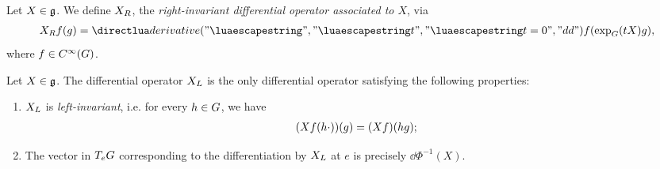 \begin{definition}
\label{definition:right-invariant_differential_operator}
    Let $X \in \mathfrak{g}$.
    We define ${X}_R$, the \emph{right-invariant differential operator associated to $X$}, via
    \begin{align*}
        \RightDifferentialOperatorFirstOrder{X} f(g)
            = \D*{t}<t = 0> f(\exp_\Group(t X) g),
    \end{align*}
    where $f \in {C^\infty(G)}$.
\end{definition}

\begin{proposition}
    Let $X \in \mathfrak{g}$.
    The differential operator ${X}_L$ is the only differential operator satisfying the following properties:
    \begin{enumerate}
        \item ${X}_L$ is \emph{left-invariant},
            i.e. for every $h \in G$, we have
            \begin{align*}
                (X f(h \cdot))(g) = (X f)(h g);
            \end{align*}
        \item The vector in $T_e G$ corresponding to the differentiation by ${X}_L$ at $e$ is precisely $\dd \Phi^{-1}(X)$.
    \end{enumerate}
\end{proposition}

